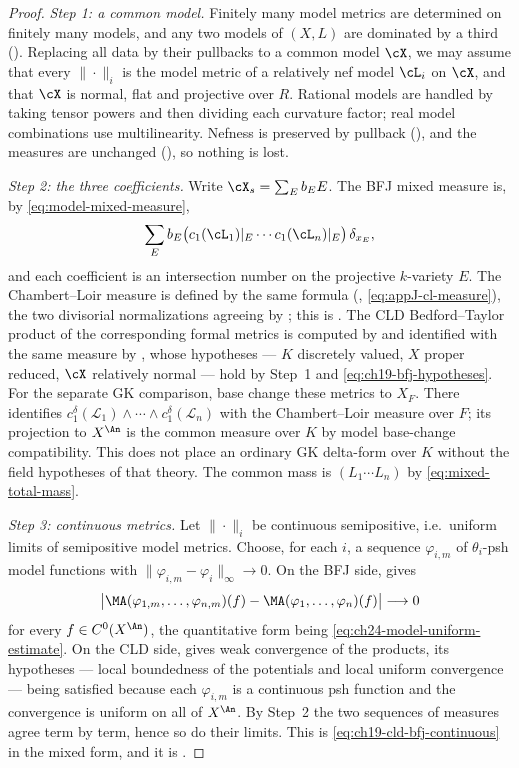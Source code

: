 \begin{proof}
\emph{Step 1: a common model.}  Finitely many model metrics are determined
on finitely many models, and any two models of $(X,L)$ are dominated by a
third ().  Replacing all data by their
pullbacks to a common model $\cX$, we may assume that every
$\|\cdot\|_i$ is the model metric of a relatively nef model
$\cL_i$ on $\cX$, and that $\cX$ is normal, flat and projective over
$R$.  Rational models are handled by taking tensor powers and then
dividing each curvature factor; real model combinations use multilinearity.
Nefness is preserved by pullback (), and the
measures are unchanged (), so nothing is lost.

\emph{Step 2: the three coefficients.}  Write $\cX_s=\sum_Eb_EE$.  The BFJ
mixed measure is, by \eqref{eq:model-mixed-measure},
\[
 \sum_Eb_E\bigl(c_1(\cL_1)|_E\cdots c_1(\cL_n)|_E\bigr)\,\delta_{x_E},
\]
and each coefficient is an intersection number on the projective
$k$-variety $E$.  The Chambert--Loir measure is defined by the same
formula (, \eqref{eq:appJ-cl-measure}), the two
divisorial normalizations agreeing by ;
this is .  The CLD Bedford--Taylor product
of the corresponding formal metrics is computed by
 and identified with the same measure by
, whose hypotheses --- $K$ discretely valued,
$X$ proper reduced, $\cX$ relatively normal --- hold by Step~1 and
\eqref{eq:ch19-bfj-hypotheses}.  For the separate GK comparison, base change these metrics to
$X_F$.  There  identifies
$c_1^\delta(\mathcal L_1)\wedge\cdots\wedge c_1^\delta(\mathcal L_n)$
with the Chambert--Loir measure over $F$; its projection to $X^{\An}$
is the common measure over $K$ by model base-change compatibility.
This does not place an ordinary GK delta-form over $K$ without the field
hypotheses of that theory.  The common mass is
$(L_1\cdots L_n)$ by \eqref{eq:mixed-total-mass}.

\emph{Step 3: continuous metrics.}  Let $\|\cdot\|_i$ be continuous
semipositive, i.e.\ uniform limits of semipositive model metrics.  Choose,
for each $i$, a sequence $\varphi_{i,m}$ of $\theta_i$-psh model
functions with $\|\varphi_{i,m}-\varphi_i\|_\infty\to0$.  On the BFJ side,
 gives
\[
 \bigl|\MA(\varphi_{1,m},\ldots,\varphi_{n,m})(f)
      -\MA(\varphi_1,\ldots,\varphi_n)(f)\bigr|
 \longrightarrow0
\]
for every $f\in C^0(X^{\An})$, the quantitative form being
\eqref{eq:ch24-model-uniform-estimate}.  On the CLD side,
 gives weak convergence of the products, its
hypotheses --- local boundedness of the potentials and local uniform
convergence --- being satisfied because each $\varphi_{i,m}$ is a
continuous psh function and the convergence is uniform on all of
$X^{\An}$.  By Step~2 the two sequences of measures agree term by term,
hence so do their limits.  This is \eqref{eq:ch19-cld-bfj-continuous} in the
mixed form, and it is .
\end{proof}

